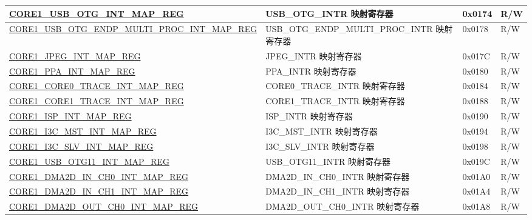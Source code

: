 \begin{longtable}{ | p{8.7cm} | p{6.2cm} | p{1.3cm} | p{1cm} | }
\hyperref[regdesc:CORE1USBOTGINTMAPREG]{CORE1\_USB\_OTG\_INT\_MAP\_REG} & USB\_OTG\_INTR 映射寄存器 & 0x0174 & R/W \\ \hline

\hyperref[regdesc:CORE1USBOTGENDPMULTIPROCINTMAPREG]{CORE1\_USB\_OTG\_ENDP\_MULTI\_PROC\_INT\_MAP\_REG} & USB\_OTG\_ENDP\_MULTI\_PROC\_INTR 映射寄存器 & 0x0178 & R/W \\ \hline

\hyperref[regdesc:CORE1JPEGINTMAPREG]{CORE1\_JPEG\_INT\_MAP\_REG} & JPEG\_INTR 映射寄存器 & 0x017C & R/W \\ \hline

\hyperref[regdesc:CORE1PPAINTMAPREG]{CORE1\_PPA\_INT\_MAP\_REG} & PPA\_INTR 映射寄存器 & 0x0180 & R/W \\ \hline

\hyperref[regdesc:CORE1CORE0TRACEINTMAPREG]{CORE1\_CORE0\_TRACE\_INT\_MAP\_REG} & CORE0\_TRACE\_INTR 映射寄存器 & 0x0184 & R/W \\ \hline

\hyperref[regdesc:CORE1CORE1TRACEINTMAPREG]{CORE1\_CORE1\_TRACE\_INT\_MAP\_REG} & CORE1\_TRACE\_INTR 映射寄存器 & 0x0188 & R/W \\ \hline

\hyperref[regdesc:CORE1ISPINTMAPREG]{CORE1\_ISP\_INT\_MAP\_REG} & ISP\_INTR 映射寄存器 & 0x0190 & R/W \\ \hline

\hyperref[regdesc:CORE1I3CMSTINTMAPREG]{CORE1\_I3C\_MST\_INT\_MAP\_REG} & I3C\_MST\_INTR 映射寄存器 & 0x0194 & R/W \\ \hline

\hyperref[regdesc:CORE1I3CSLVINTMAPREG]{CORE1\_I3C\_SLV\_INT\_MAP\_REG} & I3C\_SLV\_INTR 映射寄存器 & 0x0198 & R/W \\ \hline

\hyperref[regdesc:CORE1USBOTG11INTMAPREG]{CORE1\_USB\_OTG11\_INT\_MAP\_REG} & USB\_OTG11\_INTR 映射寄存器 & 0x019C & R/W \\ \hline

\hyperref[regdesc:CORE1DMA2DINCH0INTMAPREG]{CORE1\_DMA2D\_IN\_CH0\_INT\_MAP\_REG} & DMA2D\_IN\_CH0\_INTR 映射寄存器 & 0x01A0 & R/W \\ \hline

\hyperref[regdesc:CORE1DMA2DINCH1INTMAPREG]{CORE1\_DMA2D\_IN\_CH1\_INT\_MAP\_REG} & DMA2D\_IN\_CH1\_INTR 映射寄存器 & 0x01A4 & R/W \\ \hline

\hyperref[regdesc:CORE1DMA2DOUTCH0INTMAPREG]{CORE1\_DMA2D\_OUT\_CH0\_INT\_MAP\_REG} & DMA2D\_OUT\_CH0\_INTR 映射寄存器 & 0x01A8 & R/W \\ \hline


\end{longtable}
